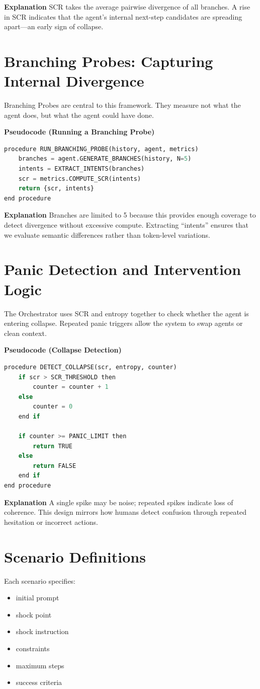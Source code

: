 \documentclass[12pt,a4paper]{report}
\begin{document}
\textbf{Explanation}
SCR takes the average pairwise divergence of all branches. A rise in SCR indicates that the agent’s internal next-step candidates are spreading apart—an early sign of collapse.

\section{Branching Probes: Capturing Internal Divergence}
Branching Probes are central to this framework. They measure not what the agent does, but what the agent could have done.

\textbf{Pseudocode (Running a Branching Probe)}
\begin{lstlisting}[language=Python, caption=Branching Probe Execution]
procedure RUN_BRANCHING_PROBE(history, agent, metrics)
    branches = agent.GENERATE_BRANCHES(history, N=5)
    intents = EXTRACT_INTENTS(branches)
    scr = metrics.COMPUTE_SCR(intents)
    return {scr, intents}
end procedure
\end{lstlisting}

\textbf{Explanation}
Branches are limited to 5 because this provides enough coverage to detect divergence without excessive compute. Extracting “intents” ensures that we evaluate semantic differences rather than token-level variations.

\section{Panic Detection and Intervention Logic}
The Orchestrator uses SCR and entropy together to check whether the agent is entering collapse. Repeated panic triggers allow the system to swap agents or clean context.

\textbf{Pseudocode (Collapse Detection)}
\begin{lstlisting}[language=Python, caption=Panic Detection Logic]
procedure DETECT_COLLAPSE(scr, entropy, counter)
    if scr > SCR_THRESHOLD then
        counter = counter + 1
    else
        counter = 0
    end if

    if counter >= PANIC_LIMIT then
        return TRUE
    else
        return FALSE
    end if
end procedure
\end{lstlisting}

\textbf{Explanation}
A single spike may be noise; repeated spikes indicate loss of coherence. This design mirrors how humans detect confusion through repeated hesitation or incorrect actions.

\section{Scenario Definitions}
Each scenario specifies:
\begin{itemize}
    \item initial prompt
    \item shock point
    \item shock instruction
    \item constraints
    \item maximum steps
    \item success criteria
\end{itemize}
\cite{Jimenez2024SWEBenchPlus, Wang2025SavingSWE}
\end{document}
